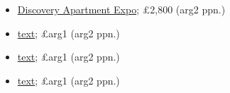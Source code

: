 \documentclass[12pt]{article}
\newcommand{\cost}[2]{\pounds#1 (#2 ppn.)}
\begin{document}
\begin{itemize}
		\item 
		\href{https://www.booking.com/hotel/pt/discovery-apartment.html?aid=355028;sid=3f62ec944d118827daff72c411262409;all_sr_blocks=126941004_337661817_9_0_0%2C126941005_337661817_2_0_0;checkin=2022-05-28;checkout=2022-06-05;dest_id=-2167973;dest_type=city;dist=0;group_adults=10;group_children=0;hapos=8;highlighted_blocks=126941004_337661817_9_0_0%2C126941005_337661817_2_0_0;hpos=8;matching_block_id=126941004_337661817_9_0_0;no_rooms=1;req_adults=10;req_children=0;room1=A%2CA%2CA%2CA%2CA%2CA%2CA%2CA%2CA%2CA;sb_price_type=total;sr_order=popularity;sr_pri_blocks=126941004_337661817_9_0_0__251800%2C126941005_337661817_2_0_0__79600;srepoch=1648314704;srpvid=b13d78e7745e0106;type=total;ucfs=1&#hotelTmpl}{Discovery Apartment Expo}; \cost{2,800}{arg2}
		\item 
		\href{URL}{text}; \cost{arg1}{arg2}
		\item 
		\href{URL}{text}; \cost{arg1}{arg2}
		\item 
		\href{URL}{text}; \cost{arg1}{arg2}
	\end{itemize}
	
\end{document}
